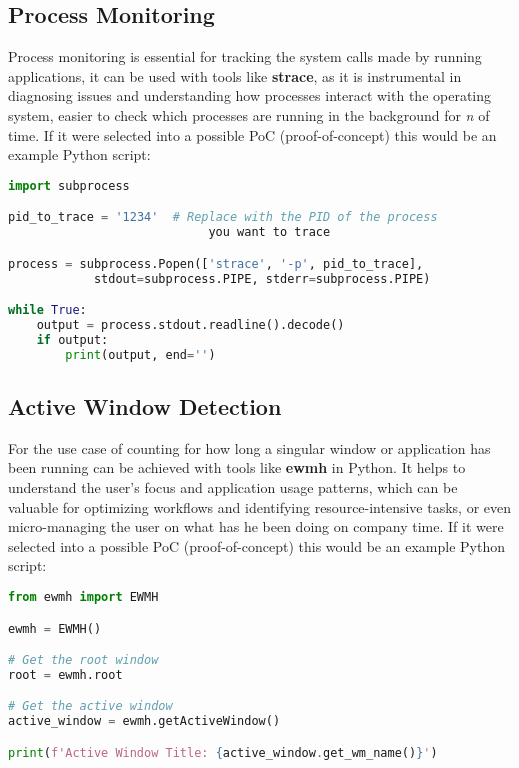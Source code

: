 \documentclass{VUMIFPSmagistrinis}
\begin{document}
\subsection{Process Monitoring}

Process monitoring is essential for tracking the system calls made by running applications, it can be used with tools like \textbf{strace}, as it is instrumental in diagnosing issues and understanding how processes interact with the operating system, easier to check which processes are running in the background for \textit{n} of time. If it were selected into a possible PoC (proof-of-concept) this would be an example Python script:
\begin{lstlisting}[language=Python]
import subprocess

pid_to_trace = '1234'  # Replace with the PID of the process 
                            you want to trace

process = subprocess.Popen(['strace', '-p', pid_to_trace], 
            stdout=subprocess.PIPE, stderr=subprocess.PIPE)

while True:
    output = process.stdout.readline().decode()
    if output:
        print(output, end='')
\end{lstlisting}

\subsection{Active Window Detection}
For the use case of counting for how long a singular window or application has been running can be achieved with tools like \textbf{ewmh} in Python. It helps to understand the user's focus and application usage patterns, which can be valuable for optimizing workflows and identifying resource-intensive tasks, or even micro-managing the user on what has he been doing on company time. If it were selected into a possible PoC (proof-of-concept) this would be an example Python script:
\begin{lstlisting}[language=Python]
from ewmh import EWMH

ewmh = EWMH()

# Get the root window
root = ewmh.root

# Get the active window
active_window = ewmh.getActiveWindow()

print(f'Active Window Title: {active_window.get_wm_name()}')
\end{lstlisting}
\end{document}
